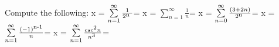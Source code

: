 \documentclass[12pt]{article}
\begin{document}
Compute the following:
\newline
x = $\sum\limits^{\infty }_{n=1 }\frac{1}{2\textsuperscript{n }}$=
\newline
x = $\sum\limits^{\infty }_{n=1 }\frac{1}{n }$=
\newline
x = $\sum\limits^{\infty }_{n=0 }\frac{(3 + 2n)}{2\textsuperscript{n }}$=
\newline
x = $\sum\limits^{\infty }_{n=1 }\frac{(-1)\textsuperscript{n-1}}{n }$=
\newline
x = $\sum\limits^{\infty }_{n=1 }\frac{csc\textsuperscript{2}n}{n\textsuperscript{3 }}$=
\end{document}
